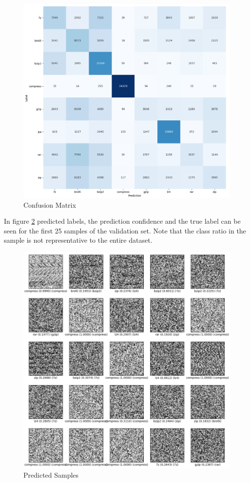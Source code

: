\documentclass[conference]{IEEEtran}
\begin{document}
\begin{figure}
    \centering
    \includegraphics[scale=0.25]{confusion-matrix.png}
    \caption{Confusion Matrix}
    \label{fig:confusion-matrix}
\end{figure}

In figure \ref{fig:samples} predicted labels, the prediction confidence and the true label can be seen for the first 25 samples of the validation set. Note that the class ratio in the sample is not representative to the entire dataset.

\begin{figure}[H]
    \centering
    \includegraphics[scale=0.25]{sample-predictions.png}
    \caption{Predicted Samples}
    \label{fig:samples}
\end{figure}
\end{document}
